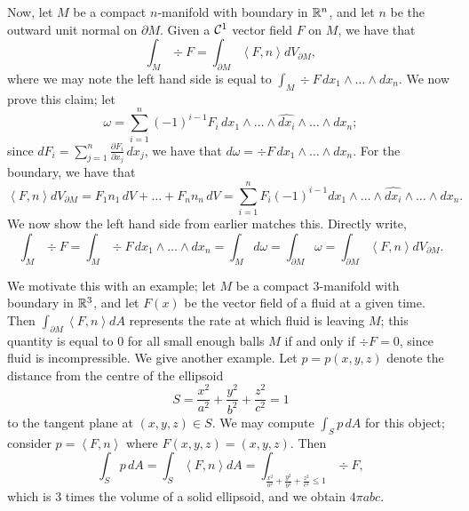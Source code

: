 Now, let $M$ be a compact $n$-manifold with boundary in $\mathbb R^n$, and let $n$ be the outward unit normal on $\partial M$. Given a $\mathcal C^1$ vector field $F$ on $M$, we have that
\[ \int_M \div F = \int_{\partial M} \left<F, n\right> dV_{\partial M}, \]
where we may note the left hand side is equal to $\int_M \div F \, dx_1 \wedge \dots \wedge dx_n$. We now prove this claim; let
\[ \omega = \sum_{i=1}^n (-1)^{i-1} F_i \, dx_1 \wedge \dots \wedge \widehat{dx_i} \wedge \dots \wedge dx_n; \]
since $dF_i = \sum_{j=1}^n \frac{\partial F_i}{\partial x_j} \, dx_j$, we have that $d\omega = \div F \, dx_1 \wedge \dots \wedge dx_n$. For the boundary, we have that
\[ \left<F, n\right> dV_{\partial M} = F_1 n_1 \, dV + \dots + F_n n_n \, dV = \sum_{i=1}^n F_i (-1)^{i-1} dx_1 \wedge \dots \wedge \widehat{dx_i} \wedge \dots \wedge dx_n. \]
We now show the left hand side from earlier matches this. Directly write,
\[ \int_M \div F = \int_M \div F \, dx_1 \wedge \dots \wedge dx_n = \int_M d\omega = \int_{\partial M} \omega = \int_{\partial M}\left<F, n\right> dV_{\partial M}. \]

\newpage
\noindent We motivate this with an example; let $M$ be a compact $3$-manifold with boundary in $\mathbb R^3$, and let $F(x)$ be the vector field of a fluid at a given time. Then $\int_{\partial M} \left<F, n\right> dA$ represents the rate at which fluid is leaving $M$; this quantity is equal to $0$ for all small enough balls $M$ if and only if $\div F = 0$, since fluid is incompressible.
\medskip\newline
We give another example. Let $p = p(x, y, z)$ denote the distance from the centre of the ellipsoid
\[ S = \frac{x^2}{a^2} + \frac{y^2}{b^2} + \frac{z^2}{c^2} = 1 \]
to the tangent plane at $(x, y, z) \in S$. We may compute $\int_S p \, dA$ for this object; consider $p = \left<F, n\right>$ where $F(x, y, z) = (x, y, z)$. Then
\[ \int_S p \, dA = \int_S \left<F, n\right> dA = \int_{\frac{x^2}{a^2} + \frac{y^2}{b^2} + \frac{z^2}{c^2} \leq 1} \div F, \]
which is $3$ times the volume of a solid ellipsoid, and we obtain $4\pi abc$.